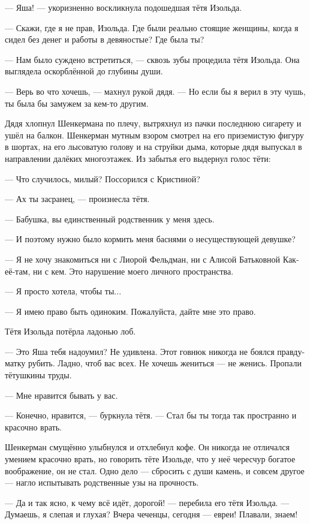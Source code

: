 \documentclass[a4paper,10pt,fleqn]{book}\usepackage{polyglossia}\setdefaultlanguage{english}\setotherlanguage{russian}\defaultfontfeatures{Ligatures=TeX,Mapping=tex-text} \usepackage{xcolor}\definecolor{lightgray}{HTML}{bbbbbb}\color{lightgray}\newcommand{\ml}[3]{\textcolor{black}{#3}}
\newcommand{\asterism}{\vspace{1em}{\centering\Large\bfseries$\ast~\ast~\ast$\par}\vspace{1em}}
\newcommand{\textspace}{\vspace{1em}{\centering\Large\bfseries<...>\par}\vspace{1em}}
\begin{document}
--- Яша! --- укоризненно воскликнула подошедшая тётя Изольда.

--- Скажи, где я не прав, Изольда.
Где были реально стоящие женщины, когда я сидел без денег и работы в девяностые?
Где была ты?

--- Нам было суждено встретиться, --- сквозь зубы процедила тётя Изольда.
Она выглядела оскорблённой до глубины души.

--- Верь во что хочешь, --- махнул рукой дядя.
--- Но если бы я верил в эту чушь, ты была бы замужем за кем-то другим.

Дядя хлопнул Шенкермана по плечу, вытряхнул из пачки последнюю сигарету и ушёл на балкон.
Шенкерман мутным взором смотрел на его приземистую фигуру в шортах, на его лысоватую голову и на струйки дыма, которые дядя выпускал в направлении далёких многоэтажек.
Из забытья его выдернул голос тёти:

--- Что случилось, милый?
Поссорился с Кристиной?

\asterism

--- Ах ты засранец, --- произнесла тётя.

--- Бабушка, вы единственный родственник у меня здесь.

--- И поэтому нужно было кормить меня баснями о несуществующей девушке?

--- Я не хочу знакомиться ни с Лиорой Фельдман, ни с Алисой Батьковной Как-её-там, ни с кем.
Это нарушение моего личного пространства.

--- Я просто хотела, чтобы ты...

--- Я имею право быть одиноким.
Пожалуйста, дайте мне это право.

Тётя Изольда потёрла ладонью лоб.

--- Это Яша тебя надоумил?
Не удивлена.
Этот говнюк никогда не боялся правду-матку рубить.
Ладно, чтоб вас всех.
Не хочешь жениться --- не женись.
Пропали тётушкины труды.

--- Мне нравится бывать у вас.

--- Конечно, нравится, --- буркнула тётя.
--- Стал бы ты тогда так пространно и красочно врать.

Шенкерман смущённо улыбнулся и отхлебнул кофе.
Он никогда не отличался умением красочно врать, но говорить тёте Изольде, что у неё чересчур богатое воображение, он не стал.
Одно дело --- сбросить с души камень, и совсем другое --- нагло испытывать родственные узы на прочность.

\textspace

--- Да и так ясно, к чему всё идёт, дорогой! --- перебила его тётя Изольда.
--- Думаешь, я слепая и глухая?
Вчера чеченцы, сегодня --- евреи!
Плавали, знаем!
\end{document}

